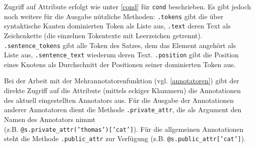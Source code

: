 \documentclass[12pt]{scrartcl}
\begin{document}
{Zugriff auf Attribute erfolgt wie unter \ref{cond} für \texttt{cond} beschrieben. Es gibt jedoch noch weitere für die Ausgabe nützliche Methoden: \texttt{.tokens} gibt die über syntaktische Kanten dominierten Token als Liste aus, \texttt{.text} deren Text als Zeichenkette (die einzelnen Tokentexte mit Leerzeichen getrennt). \texttt{.sentence\_tokens} gibt alle Token des Satzes, dem das Element angehört als Liste aus, \texttt{.sentence\_text} wiederum deren Text. \texttt{.position} gibt die Position eines Knotens als Durchschnitt der Positionen seiner dominierten Token aus.

Bei der Arbeit mit der Mehrannotatorenfunktion (vgl. \ref{annotatoren}) gibt der direkte Zugriff auf die Attribute (mittels eckiger Klammern) die Annotationen des aktuell eingestellten Annotators aus.
Für die Ausgabe der Annotationen anderer Annotatoren dient die Methode \texttt{.private\_attr}, die als Argument den Namen des Annotators nimmt\\(z.B. \texttt{@s.private\_attr('thomas')['cat']}).
Für die allgemeinen Annotationen steht die Methode \texttt{.public\_attr} zur Verfügung (z.B. \texttt{@s.public\_attr['cat']}).



}
\end{document}
